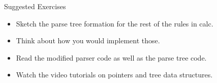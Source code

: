\documentclass[handout]{beamer}
\begin{document}
\begin{frame}{Suggested Exercises}
    \begin{itemize}
        \item Sketch the parse tree formation for the rest of the rules in calc.
        \item Think about how you would implement those.
        \item Read the modified parser code as well as the parse tree code.
        \item Watch the video tutorials on pointers and tree data structures.
    \end{itemize}
\end{frame}
\end{document}
